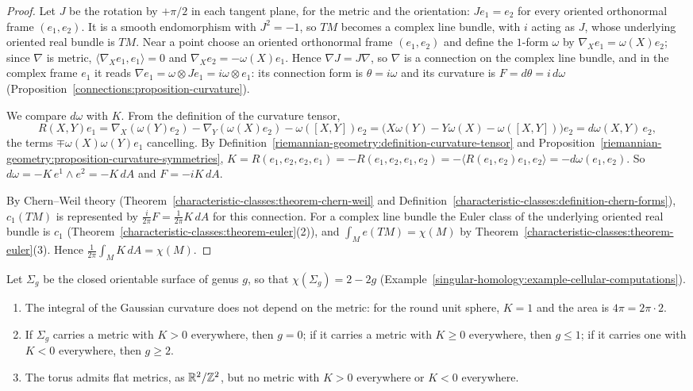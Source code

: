 \begin{proof}
Let $J$ be the rotation by $+\pi/2$ in each tangent plane, for the metric and the orientation: $Je_1 = e_2$ for every oriented orthonormal frame $(e_1, e_2)$. It is a smooth endomorphism with $J^2 = -1$, so $TM$ becomes a
complex line bundle, with $i$ acting as $J$, whose underlying oriented real bundle is $TM$. Near a point choose an oriented orthonormal frame $(e_1, e_2)$ and define the $1$-form $\omega$ by $\nabla_Xe_1 = \omega(X)e_2$; since
$\nabla$ is metric, $\langle\nabla_Xe_1, e_1\rangle = 0$ and $\nabla_Xe_2 = -\omega(X)e_1$. Hence $\nabla J = J\nabla$, so $\nabla$ is a connection on the complex line bundle, and in the complex frame $e_1$ it reads
$\nabla e_1 = \omega \otimes Je_1 = i\omega \otimes e_1$: its connection form is $\theta = i\omega$ and its curvature is $F = d\theta = i\,d\omega$ (Proposition~\ref{connections:proposition-curvature}).

We compare $d\omega$ with $K$. From the definition of the curvature tensor,
\[
R(X, Y)e_1 = \nabla_X(\omega(Y)e_2) - \nabla_Y(\omega(X)e_2) - \omega([X, Y])e_2 = \big(X\omega(Y) - Y\omega(X) - \omega([X, Y])\big)e_2 = d\omega(X, Y)\,e_2,
\]
the terms $\mp\omega(X)\omega(Y)e_1$ cancelling. By Definition~\ref{riemannian-geometry:definition-curvature-tensor} and Proposition~\ref{riemannian-geometry:proposition-curvature-symmetries},
$K = R(e_1, e_2, e_2, e_1) = -R(e_1, e_2, e_1, e_2) = -\langle R(e_1, e_2)e_1, e_2\rangle = -d\omega(e_1, e_2)$. So $d\omega = -K\,e^1 \wedge e^2 = -K\,dA$ and $F = -iK\,dA$.

By Chern--Weil theory (Theorem~\ref{characteristic-classes:theorem-chern-weil} and Definition~\ref{characteristic-classes:definition-chern-forms}), $c_1(TM)$ is represented by $\frac{i}{2\pi}F = \frac{1}{2\pi}K\,dA$ for this connection.
For a complex line bundle the Euler class of the underlying oriented real bundle is $c_1$ (Theorem~\ref{characteristic-classes:theorem-euler}(2)), and $\int_Me(TM) = \chi(M)$ by
Theorem~\ref{characteristic-classes:theorem-euler}(3). Hence $\frac{1}{2\pi}\int_MK\,dA = \chi(M)$.
\end{proof}

\begin{corollary}\label{riemannian-geometry:corollary-gauss-bonnet}
Let $\Sigma_g$ be the closed orientable surface of genus $g$, so that $\chi(\Sigma_g) = 2 - 2g$ (Example~\ref{singular-homology:example-cellular-computations}).
\begin{enumerate}
\item The integral of the Gaussian curvature does not depend on the metric: for the round unit sphere, $K = 1$ and the area is $4\pi = 2\pi \cdot 2$.
\item If $\Sigma_g$ carries a metric with $K > 0$ everywhere, then $g = 0$; if it carries a metric with $K \geq 0$ everywhere, then $g \leq 1$; if it carries one with $K < 0$ everywhere, then $g \geq 2$.
\item The torus admits flat metrics, as $\mathbb{R}^2/\mathbb{Z}^2$, but no metric with $K > 0$ everywhere or $K < 0$ everywhere.
\end{enumerate}
\end{corollary}


